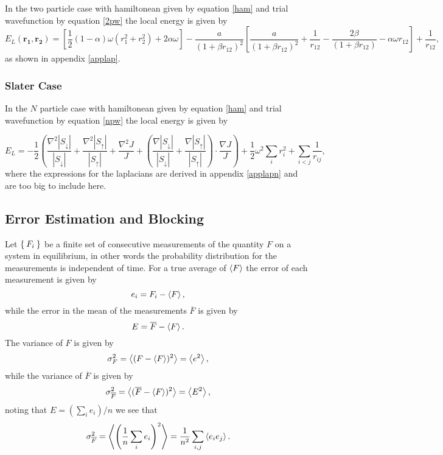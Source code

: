 \documentclass[a4paper,English,10pt]{article}
\newcommand{\bb}[1]{\boldsymbol{#1}}
\newcommand{\uar}{\uparrow}
\newcommand{\dar}{\downarrow}
\newcommand{\be}{\begin{equation}}
\newcommand{\ee}{\end{equation}}
\newcommand{\f}{\frac}
\renewcommand{\bar}{\overline}
\renewcommand{\braket}{\Braket}
\begin{document}
In the two particle case with hamiltonean given by equation \ref{ham} and trial wavefunction by equation \ref{2pw} the local energy is given by
\be
E_L(\bb{r_1},\bb{r_2}) = \left[\f{1}{2}(1- \alpha)\omega(r_1^2 + r_2^2) + 2\alpha\omega\right]  - \f{a}{(1+\beta r_{12})^2}\left[\f{a}{(1+\beta r_{12})^2}+  \f{1}{r_{12}} - \f{2\beta}{(1+\beta r_{12})} -\alpha\omega r_{12}\right] + \f{1}{r_{12}},
\ee
as shown in appendix \ref{applap}.

\subsubsection{Slater Case}
In the $N$ particle case with hamiltonean given by equation \ref{ham} and trial wavefunction by equation \ref{npw} the local energy is given by

\be
E_L = -\f{1}{2}\left(\f{\nabla^2|S_\dar|}{|S_\dar|} + \f{\nabla^2|S_\uar|}{|S_\uar|} + \f{\nabla^2J}{J} +  \left(\f{\nabla|S_\dar|}{|S_\dar|} + \f{\nabla|S_\uar|}{|S_\uar|}\right)\cdot
\f{\nabla J}{J}\right) + \f{1}{2}\omega^2\sum_ir_i^2 + \sum_{i<j}\f{1}{r_{ij}},
\ee
where the expressions for the laplacians are derived in appendix \ref{applapn} and are too big to include here.

\subsection{Error Estimation and Blocking}

Let $\Set{F_i}$ be a finite set of consecutive measurements of the quantity $F$ on a system in equilibrium, in other words the probability distribution for the measurements is
independent of time. For a true average of $\braket{F}$ the error of each measurement is given by
\be
e_i = F_i - \braket{F},
\ee
while the error in the mean of the measurements $\bar{F}$ is given by
\be
E = \bar{F} - \braket{F}.
\ee
The variance of $F$ is given by
\be
\sigma^2_F = \braket{(F-\braket{F})^2} = \braket{e^2},
\ee
while the variance of $\bar{F}$ is given by
\be
\sigma^2_{\bar{F}} = \braket{(\bar{F}-\braket{F})^2} = \braket{E^2},
\ee
noting that $E = (\sum_ie_i)/n$ we see that
\be
\sigma^2_{\bar{F}} = \braket{\left(\f{1}{n}\sum_ie_i\right)^2} = \f{1}{n^2}\sum_{i,j}\braket{e_ie_j}.\label{sigmam}
\ee
\end{document}
